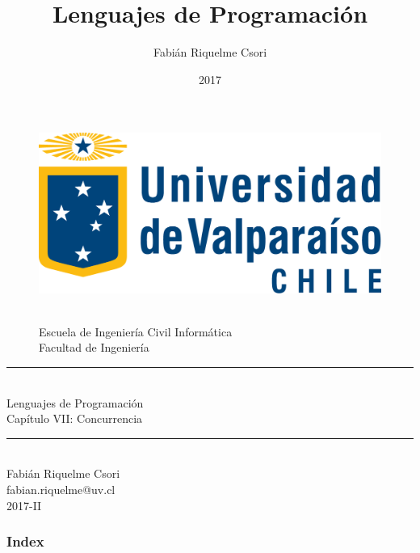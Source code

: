 \documentclass[handout]{beamer} %
\title{Lenguajes de Programación}                     %
\author{Fabián Riquelme Csori}                        %
\date{2017}                                           %
\institute{Universidad de Valparaíso}                 %
\newcommand{\HRule}{\rule{\linewidth}{0.2mm}\\[1ex]}
\begin{document}
%

\begin{frame}[plain]
  \begin{figure}[h]
    \begin{minipage}{0.3\textwidth}
    \includegraphics[width=.9\textwidth]{./image/logo-UV.png}
    \end{minipage}
    \begin{minipage}{0.65\textwidth}
     $~$\\[3.6ex]
     \footnotesize{Escuela de Ingeniería Civil Informática}\\
     \footnotesize{Facultad de Ingeniería}
    \end{minipage}
  \end{figure}
  \begin{center}
    \vspace{1ex}
    \HRule
    \Large{Lenguajes de Programación}\\{\small Capítulo VII: Concurrencia}\\[-1ex]
    \HRule\vspace{1ex}
    \large{Fabián Riquelme Csori}\\[.5ex]\footnotesize{fabian.riquelme@uv.cl}\\[6ex] {\tiny 2017-II}\\[6ex]
  \end{center}
\end{frame}

\begin{frame}
 \frametitle{Index}
 \scriptsize 			%
 \tableofcontents		%
\end{frame}
\end{document}
